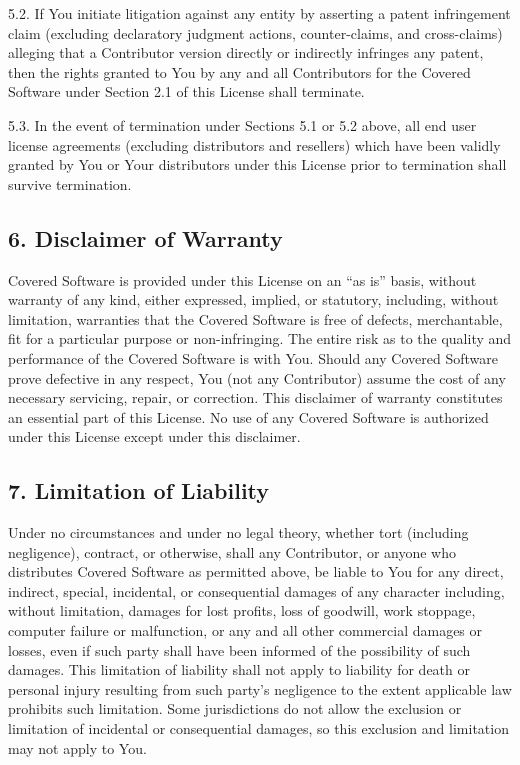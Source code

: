 \documentclass[letterpaper,10pt,english]{sphinxmanual}
\begin{document}
5.2. If You initiate litigation against any entity by asserting a patent
infringement claim (excluding declaratory judgment actions,
counter-claims, and cross-claims) alleging that a Contributor version
directly or indirectly infringes any patent, then the rights granted to
You by any and all Contributors for the Covered Software under Section
2.1 of this License shall terminate.

5.3. In the event of termination under Sections 5.1 or 5.2 above, all
end user license agreements (excluding distributors and resellers) which
have been validly granted by You or Your distributors under this License
prior to termination shall survive termination.


\subsection{6. Disclaimer of Warranty}
\label{\detokenize{warranty:disclaimer-of-warranty}}
Covered Software is provided under this License on an “as is” basis, without warranty of any kind, either expressed, implied, or statutory, including, without limitation, warranties that the Covered Software is free of defects, merchantable, fit for a particular purpose or non-infringing. The entire risk as to the quality and performance of the Covered Software is with You. Should any Covered Software prove defective in any respect, You (not any Contributor) assume the cost of any necessary servicing, repair, or correction. This disclaimer of warranty constitutes an essential part of this License. No use of any Covered Software is authorized under this License except under this disclaimer.


\subsection{7. Limitation of Liability}
\label{\detokenize{warranty:limitation-of-liability}}
Under no circumstances and under no legal theory, whether tort (including negligence), contract, or otherwise, shall any Contributor, or anyone who distributes Covered Software as permitted above, be liable to You for any direct, indirect, special, incidental, or consequential damages of any character including, without limitation, damages for lost profits, loss of goodwill, work stoppage, computer failure or malfunction, or any and all other commercial damages or losses, even if such party shall have been informed of the possibility of such damages. This limitation of liability shall not apply to liability for death or personal injury resulting from such party’s negligence to the extent applicable law prohibits such limitation. Some jurisdictions do not allow the exclusion or limitation of incidental or consequential damages, so this exclusion and limitation may not apply to You.
\end{document}
